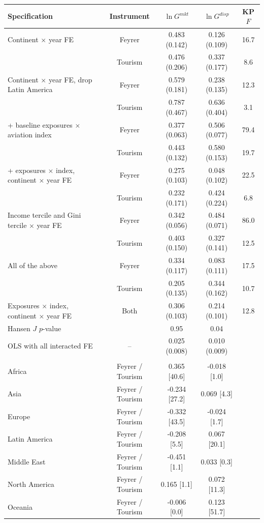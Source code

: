 \begin{tabular}{lcccc}
\toprule
Specification & Instrument & $\ln G^{mkt}$ & $\ln G^{disp}$ & KP $F$ \\
\midrule
Continent $\times$ year FE & Feyrer & 0.483\sym{***} (0.142) & 0.126 (0.109) & 16.7 \\
 & Tourism & 0.476\sym{**} (0.206) & 0.337\sym{*} (0.177) & 8.6 \\
Continent $\times$ year FE, drop Latin America & Feyrer & 0.579\sym{***} (0.181) & 0.238\sym{*} (0.135) & 12.3 \\
 & Tourism & 0.787\sym{*} (0.467) & 0.636 (0.404) & 3.1 \\
+ baseline exposures $\times$ aviation index & Feyrer & 0.377\sym{***} (0.063) & 0.506\sym{***} (0.077) & 79.4 \\
 & Tourism & 0.443\sym{***} (0.132) & 0.580\sym{***} (0.153) & 19.7 \\
+ exposures $\times$ index, continent $\times$ year FE & Feyrer & 0.275\sym{***} (0.103) & 0.048 (0.102) & 22.5 \\
 & Tourism & 0.232 (0.171) & 0.424\sym{*} (0.224) & 6.8 \\
Income tercile and Gini tercile $\times$ year FE & Feyrer & 0.342\sym{***} (0.056) & 0.484\sym{***} (0.071) & 86.0 \\
 & Tourism & 0.403\sym{***} (0.150) & 0.327\sym{**} (0.141) & 12.5 \\
All of the above & Feyrer & 0.334\sym{***} (0.117) & 0.083 (0.111) & 17.5 \\
 & Tourism & 0.205 (0.135) & 0.344\sym{**} (0.162) & 10.7 \\
Exposures $\times$ index, continent $\times$ year FE & Both & 0.306\sym{***} (0.103) & 0.214\sym{**} (0.101) & 12.8 \\
\quad Hansen $J$ $p$-value & & 0.95 & 0.04 & \\
OLS with all interacted FE & -- & 0.025\sym{***} (0.008) & 0.010 (0.009) & \\
\addlinespace\multicolumn{5}{l}{\emph{First stage by continent (coefficient on instrument, KP $F$)}}\\
Africa & Feyrer / Tourism & 0.365\sym{***} [40.6] & -0.018 [1.0] & \\
Asia & Feyrer / Tourism & -0.234\sym{***} [27.2] & 0.069\sym{**} [4.3] & \\
Europe & Feyrer / Tourism & -0.332\sym{***} [43.5] & -0.024 [1.7] & \\
Latin America & Feyrer / Tourism & -0.208\sym{**} [5.5] & 0.067\sym{***} [20.1] & \\
Middle East & Feyrer / Tourism & -0.451 [1.1] & 0.033 [0.3] & \\
North America & Feyrer / Tourism & 0.165 [1.1] & 0.072\sym{***} [11.3] & \\
Oceania & Feyrer / Tourism & -0.006 [0.0] & 0.123\sym{***} [51.7] & \\
\bottomrule
\end{tabular}